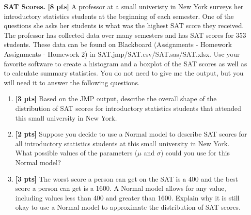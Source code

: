 \item  \textbf{SAT Scores.  [8 pts]} A professor at a small univeristy in New York surveys her introductory statistics students at the beginning of each semester.  One of the questions she asks her students is what was the highest SAT score they received.  The professor has collected data over many semesters and has SAT scores for 353 students.  These data can be found on Blackboard (Assignments - Homework Assignments - Homework 2) in SAT.jmp/SAT.csv/SAT.sas/SAT.xlsx.  Use your favorite software to create a histogram and a boxplot of the SAT scores as well as to calculate summary statistics.  You do not need to give me the output, but you will need it to answer the following questions.
\begin{enumerate}
\item \textbf{ [3 pts]}  Based on the JMP output, describe the overall shape of the distribution of SAT scores for introductory statistics students that attended this small university in New York.\\

\item \textbf{  [2 pts]}  Suppose you decide to use a Normal model to describe SAT scores for all introductory statistics students at this small university in New York.  What possible values of the parameters ($\mu$ and $\sigma$) could you use for this Normal model?\\

\item \textbf{ [3 pts]}  The worst score a person can get on the SAT is a 400 and the best score a person can get is a 1600.  A Normal model allows for any value, including values less than 400 and greater than 1600.  Explain why it is still okay to use a Normal model to approximate the distribution of SAT scores. \\

\end{enumerate}
